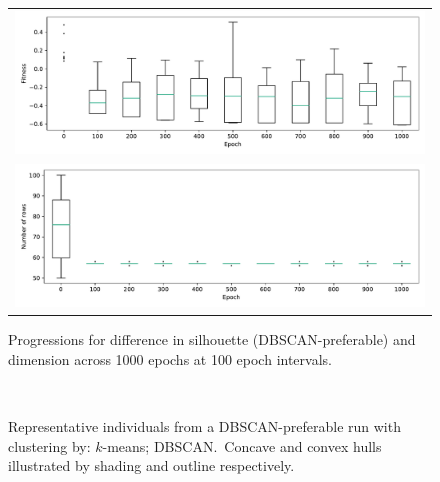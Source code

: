 \documentclass[smallextended]{svjour3}
\newlength{\imgwidth}
\begin{document}
\begin{figure}[htbp]
    \centering
    \begin{tabular}{c}
        \includegraphics[width=\imgwidth]{Fig13-1.pdf}
        \\
        \includegraphics[width=\imgwidth]{Fig13-2.pdf}
    \end{tabular}
    \caption{%
        Progressions for difference in silhouette (DBSCAN-preferable) and
        dimension across 1000 epochs at 100 epoch intervals.
    }\label{fig:negative-prog}
\end{figure}

\begin{figure}[htbp]
    \centering
    \\
    \caption[]{%
        Representative individuals from a DBSCAN-preferable run with clustering
        by:  \(k\)-means; 
        DBSCAN.\ Concave and convex hulls illustrated by shading and outline
        respectively. 
    }\label{fig:negative-inds}
\end{figure}
\end{document}
